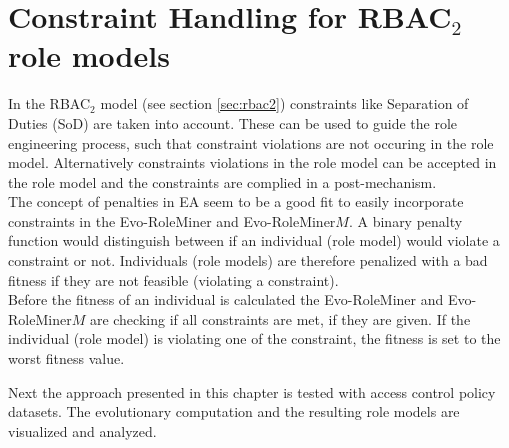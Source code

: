     \section{Constraint Handling for RBAC$_2$ role models}
    In the RBAC$_2$ model (see section \ref{sec:rbac2}) constraints like Separation of Duties (SoD) are taken into account. These can be used to guide the role engineering process, such that constraint violations are not occuring in the role model. Alternatively constraints violations in the role model can be accepted in the role model and the constraints are complied in a post-mechanism.\\
    The concept of penalties in EA seem to be a good fit to easily incorporate constraints in the Evo-RoleMiner and Evo-RoleMiner$M$. A binary penalty function would distinguish between if an individual (role model) would violate a constraint or not. Individuals (role models) are therefore penalized with a bad fitness if they are not feasible (violating a constraint).\\
    Before the fitness of an individual is calculated the Evo-RoleMiner and Evo-RoleMiner$M$ are checking if all constraints are met, if they are given. If the individual (role model) is violating one of the constraint, the fitness is set to the worst fitness value.
    
\hfill \break
Next the approach presented in this chapter is tested with access control policy datasets. The evolutionary computation and the resulting role models are visualized and analyzed.
